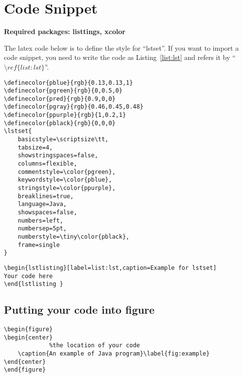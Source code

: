 \section{Code Snippet}

\noindent\textbf{Required packages: listtings, xcolor}

The latex code below is to define the style for ``lstset''. If you want to import a code snippet, you need to write the code as Listing~\ref{list:lst} and refers it by ``$\setminus ref\{list:lst\}$''.

\begin{lstlisting}[caption=Style definition for lstset]
\definecolor{pblue}{rgb}{0.13,0.13,1}
\definecolor{pgreen}{rgb}{0,0.5,0}
\definecolor{pred}{rgb}{0.9,0,0}
\definecolor{pgray}{rgb}{0.46,0.45,0.48}
\definecolor{ppurple}{rgb}{1,0.2,1}
\definecolor{pblack}{rgb}{0,0,0}
\lstset{
	basicstyle=\scriptsize\tt,
	tabsize=4,
	showstringspaces=false,
	columns=flexible,
	commentstyle=\color{pgreen},
  	keywordstyle=\color{pblue},
  	stringstyle=\color{ppurple},
	breaklines=true,
	language=Java,
    showspaces=false,
    numbers=left, 
    numbersep=5pt,
    numberstyle=\tiny\color{pblack},
    frame=single
}

\end{lstlisting}

\begin{lstlisting}[label=list:lst,caption=Example for lstset]
\begin{lstlisting}[label=list:lst,caption=Example for lstset]
Your code here
\end{lstlisting }
\end{lstlisting}

\subsection{Putting your code into figure}

\begin{lstlisting}
\begin{figure}
\begin{center}
             %the location of your code
    \caption{An example of Java program}\label{fig:example}
\end{center}
\end{figure}
\end{lstlisting}

